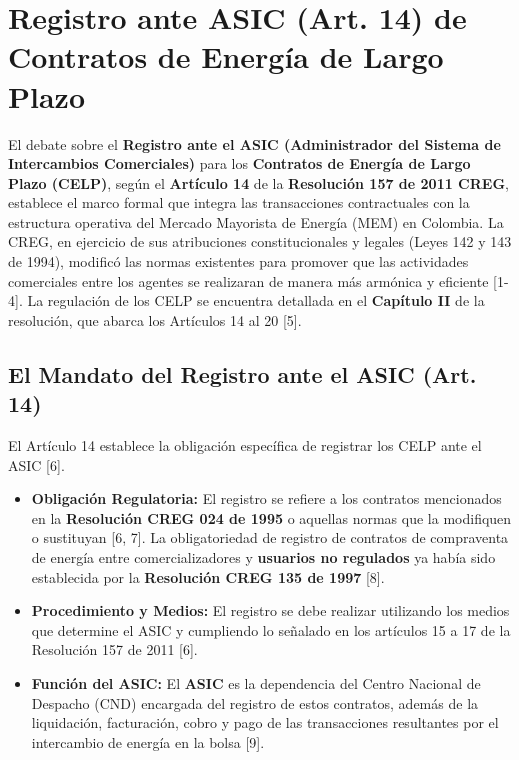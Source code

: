 \documentclass[a5paper]{book}%
\begin{document}
  
  
  \section{Registro ante ASIC (Art. 14) de Contratos de Energía de Largo Plazo}
  
  El debate sobre el \textbf{Registro ante el ASIC (Administrador del Sistema de Intercambios Comerciales)} para los \textbf{Contratos de Energía de Largo Plazo (CELP)}, según el \textbf{Artículo 14} de la \textbf{Resolución 157 de 2011 CREG}, establece el marco formal que integra las transacciones contractuales con la estructura operativa del Mercado Mayorista de Energía (MEM) en Colombia. La CREG, en ejercicio de sus atribuciones constitucionales y legales (Leyes 142 y 143 de 1994), modificó las normas existentes para promover que las actividades comerciales entre los agentes se realizaran de manera más armónica y eficiente [1-4]. La regulación de los CELP se encuentra detallada en el \textbf{Capítulo II} de la resolución, que abarca los Artículos 14 al 20 [5].
  
  \subsection{El Mandato del Registro ante el ASIC (Art. 14)}
  
  El Artículo 14 establece la obligación específica de registrar los CELP ante el ASIC [6].
  
  \begin{itemize}
  	\item \textbf{Obligación Regulatoria:} El registro se refiere a los contratos mencionados en la \textbf{Resolución CREG 024 de 1995} o aquellas normas que la modifiquen o sustituyan [6, 7]. La obligatoriedad de registro de contratos de compraventa de energía entre comercializadores y \textbf{usuarios no regulados} ya había sido establecida por la \textbf{Resolución CREG 135 de 1997} [8].
  	\item \textbf{Procedimiento y Medios:} El registro se debe realizar utilizando los medios que determine el ASIC y cumpliendo lo señalado en los artículos 15 a 17 de la Resolución 157 de 2011 [6].
  	\item \textbf{Función del ASIC:} El \textbf{ASIC} es la dependencia del Centro Nacional de Despacho (CND) encargada del registro de estos contratos, además de la liquidación, facturación, cobro y pago de las transacciones resultantes por el intercambio de energía en la bolsa [9].
  \end{itemize}
  
\end{document}
